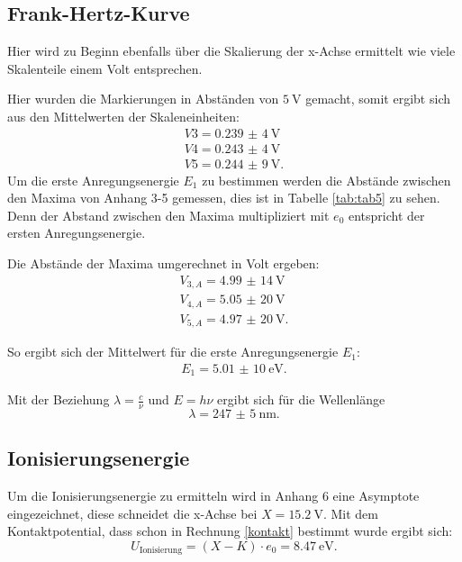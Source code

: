 \subsection{Frank-Hertz-Kurve}
Hier wird zu Beginn ebenfalls über die Skalierung der x-Achse ermittelt wie viele
Skalenteile einem Volt entsprechen.

Hier wurden die Markierungen in Abständen von $\SI{5}{\V}$ gemacht, somit ergibt
sich aus den Mittelwerten der Skaleneinheiten:
\begin{align*}
  V3=\SI{0,239(4)}{\V}\\
  V4=\SI{0,243(4)}{\V}\\
  V5=\SI{0,244(9)}{\V}.
\end{align*}
Um die erste Anregungsenergie $E_1$ zu bestimmen werden die Abstände zwischen den
Maxima von Anhang 3-5 gemessen, dies ist in Tabelle \ref{tab:tab5} zu sehen.
Denn der Abstand zwischen den Maxima multipliziert mit
$e_0$ entspricht der ersten Anregungsenergie.

Die Abstände der Maxima umgerechnet in Volt ergeben:
\begin{align*}
  V_{3,A}=\SI{4,99(14)}{\V}\\
  V_{4,A}=\SI{5,05(20)}{\V}\\
  V_{5,A}=\SI{4,97(20)}{\V}.
\end{align*}

So ergibt sich der Mittelwert für die erste Anregungsenergie $E_1$:
\begin{align*}
  E_1=\SI{5,01(10)}{\eV}.
\end{align*}

Mit der Beziehung $\lambda=\frac{c}{\nu}$ und $E=h\nu$ ergibt sich für die Wellenlänge
\begin{equation}
  \lambda=\SI{247(5)}{\nm}.
\end{equation}

\subsection{Ionisierungsenergie}
Um die Ionisierungsenergie zu ermitteln wird in Anhang 6 eine Asymptote eingezeichnet,
diese schneidet die x-Achse bei $X=\SI{15,2}{\V}$.
Mit dem Kontaktpotential, dass schon in Rechnung \ref{kontakt} bestimmt
wurde ergibt sich:
\begin{equation}
  U_{\text{Ionisierung}}=(X-K)\cdot e_0=\SI{8,47}{\eV}.
\end{equation}
